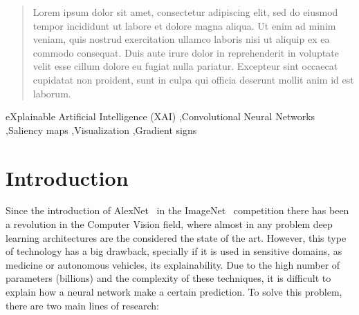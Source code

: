 \documentclass[preprint,12pt]{elsarticle}
\begin{document}
\begin{frontmatter}
\author[inst2]{Jaime Boal}
\author[inst2]{Eugenio F. Sánchez-Úbeda}


\begin{abstract}
Lorem ipsum dolor sit amet, consectetur adipiscing elit, sed do eiusmod tempor incididunt ut labore et dolore magna aliqua. Ut enim ad minim veniam, quis nostrud exercitation ullamco laboris nisi ut aliquip ex ea commodo consequat. Duis aute irure dolor in reprehenderit in voluptate velit esse cillum dolore eu fugiat nulla pariatur. Excepteur sint occaecat cupidatat non proident, sunt in culpa qui officia deserunt mollit anim id est laborum.
\end{abstract}



\begin{keyword}
eXplainable Artificial Intelligence (XAI) \sep Convolutional Neural Networks \sep Saliency maps \sep Visualization \sep Gradient signs
\end{keyword}

\end{frontmatter}


\section{Introduction}
\label{sec:introduction}
Since the introduction of AlexNet~\cite{krizhevskyImageNetClassificationDeep2012} in the ImageNet~\cite{ImageNet} competition there has been a revolution in the Computer Vision field, where almost in any problem deep learning architectures are the considered the state of the art. However, this type of technology has a big drawback, specially if it is used in sensitive domains, as medicine or autonomous vehicles, its explainability. Due to the high number of parameters (billions) and the complexity of these techniques, it is difficult to explain how a neural network make a certain prediction. To solve this problem, there are two main lines of research:
\end{document}

